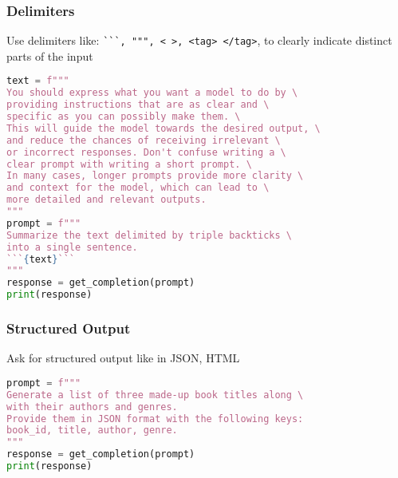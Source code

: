 \begin{frame}[fragile]\frametitle{Delimiters}

Use delimiters like: \lstinline|```, """, < >, <tag> </tag>|,  to clearly indicate distinct parts of the input

\begin{lstlisting}[language=Python]
text = f"""
You should express what you want a model to do by \ 
providing instructions that are as clear and \ 
specific as you can possibly make them. \ 
This will guide the model towards the desired output, \ 
and reduce the chances of receiving irrelevant \ 
or incorrect responses. Don't confuse writing a \ 
clear prompt with writing a short prompt. \ 
In many cases, longer prompts provide more clarity \ 
and context for the model, which can lead to \ 
more detailed and relevant outputs.
"""
prompt = f"""
Summarize the text delimited by triple backticks \ 
into a single sentence.
```{text}```
"""
response = get_completion(prompt)
print(response)
\end{lstlisting}
		
		
\end{frame}

\begin{frame}[fragile]\frametitle{Structured Output}

Ask for structured output like in JSON, HTML

\begin{lstlisting}[language=Python]
prompt = f"""
Generate a list of three made-up book titles along \ 
with their authors and genres. 
Provide them in JSON format with the following keys: 
book_id, title, author, genre.
"""
response = get_completion(prompt)
print(response)
\end{lstlisting}
		
		
\end{frame}


